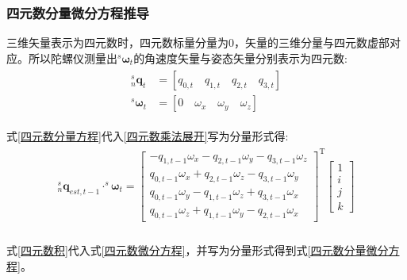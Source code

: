\documentclass[12pt,a4paper]{article}
\begin{document}
\subsubsection{四元数分量微分方程推导}\label{section:四元数分量微分方程推导}
三维矢量表示为四元数时，四元数标量分量为0，矢量的三维分量与四元数虚部对应。所以陀螺仪测量出$^s\bm{\omega}_t$的角速度矢量与姿态矢量分别表示为四元数:
\begin{eqnarray}\label{四元数分量方程}
    \begin{split}
        ^s_n\bm{q}_t&=[q_{0,t}\quad q_{1,t}\quad q_{2,t}\quad q_{3,t}] \\
        ^s\bm{\omega}_t&=[0\quad \omega_x\quad \omega_y\quad \omega_z]
    \end{split}
\end{eqnarray} 

式\ref{四元数分量方程}代入\ref{四元数乘法展开}写为分量形式得:
\begin{eqnarray}\label{四元数积}
    \begin{split} 
        ^s_n\bm{q}_{est,t-1}\cdot^s{\bm{\omega}}_t=
        \left[\begin{matrix}
                -q_{1,t-1}\omega_x-q_{2,t-1}\omega_y-q_{3,t-1}\omega_z \\
                 q_{0,t-1}\omega_x+q_{2,t-1}\omega_z-q_{3,t-1}\omega_y \\
                 q_{0,t-1}\omega_y-q_{1,t-1}\omega_z+q_{3,t-1}\omega_x \\
                 q_{0,t-1}\omega_z+q_{1,t-1}\omega_y-q_{2,t-1}\omega_x
        \end{matrix}\right]^\mathrm{T}
        \left[\begin{matrix}
                1 \\ i \\ j \\ k
        \end{matrix}\right] \\
    \end{split}
\end{eqnarray} 

式\ref{四元数积}代入式\ref{四元数微分方程}，并写为分量形式得到式\ref{四元数分量微分方程}。
\end{document}
